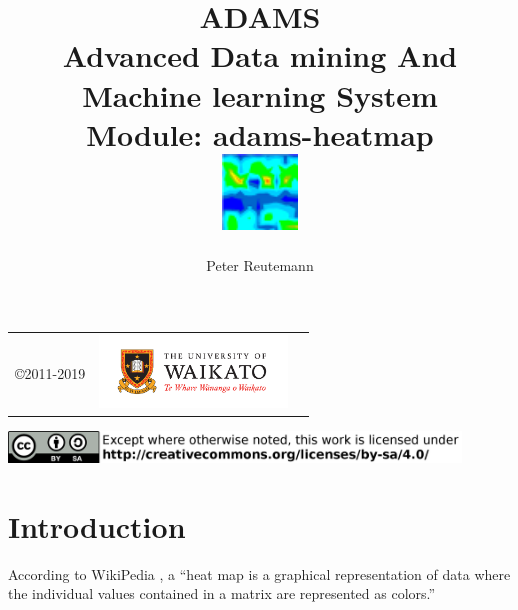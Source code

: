 \documentclass[a4paper]{book}
\title{
  \textbf{ADAMS} \\
  {\Large \textbf{A}dvanced \textbf{D}ata mining \textbf{A}nd \textbf{M}achine
  learning \textbf{S}ystem} \\
  {\Large Module: adams-heatmap} \\
  \vspace{1cm}
  \includegraphics[width=2cm]{images/heatmap-module.png} \\
}
\author{
  Peter Reutemann
}
\begin{document}
\begin{titlepage}
\maketitle

\thispagestyle{empty}
\center
\begin{table}[b]
	\begin{tabular}{c l l}
		\parbox[c][2cm]{2cm}{\copyright 2011-2019} &
		\parbox[c][2cm]{5cm}{\includegraphics[width=5cm]{images/coat_of_arms.pdf}} \\
	\end{tabular}
	\includegraphics[width=12cm]{images/cc.png} \\
\end{table}

\end{titlepage}

\tableofcontents
\listoffigures

\chapter{Introduction}
According to WikiPedia \cite{heatmap}, a ``heat map is a graphical representation of data 
where the individual values contained in a matrix are represented as 
colors.''

\end{document}
